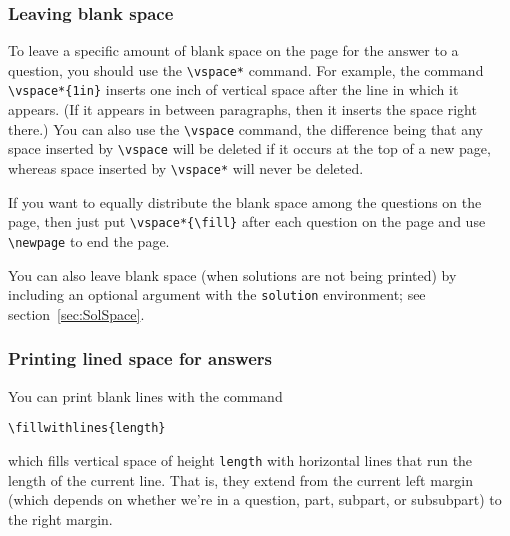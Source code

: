 \documentclass[12pt]{exam}
\begin{document}
\subsubsection{Leaving blank space}
\label{sec:BlankSpace}

To leave a specific amount of blank space on the page for the answer
to a question, you should use the \verb"\vspace*" command.  For
example, the command \verb"\vspace*{1in}" inserts one inch of vertical
space after the line in which it appears.  (If it appears in between
paragraphs, then it inserts the space right there.)  You can also use
the \verb"\vspace" command, the difference being that any space
inserted by \verb"\vspace" will be deleted if it occurs at the top
of a new page, whereas space inserted by \verb"\vspace*" will never
be deleted.

If you want to equally distribute the blank space among the questions
on the page, then just put \verb"\vspace*{\fill}" after each question
on the page and use \verb"\newpage" to end the page.

You can also leave blank space (when solutions are not being printed)
by including an optional argument with the \verb"solution"
environment; see section~\ref{sec:SolSpace}.

\subsubsection{Printing lined space for answers}
\label{sec:FillLines}

You can print blank lines with the command
\begin{center}
  \verb"\fillwithlines{length}"
\end{center}
which fills vertical space of height \verb"length" with horizontal
lines that run the length of the current line.  That is, they extend
from the current left margin (which depends on whether we're in a
question, part, subpart, or subsubpart) to the right margin.

\medskip
\end{document}
